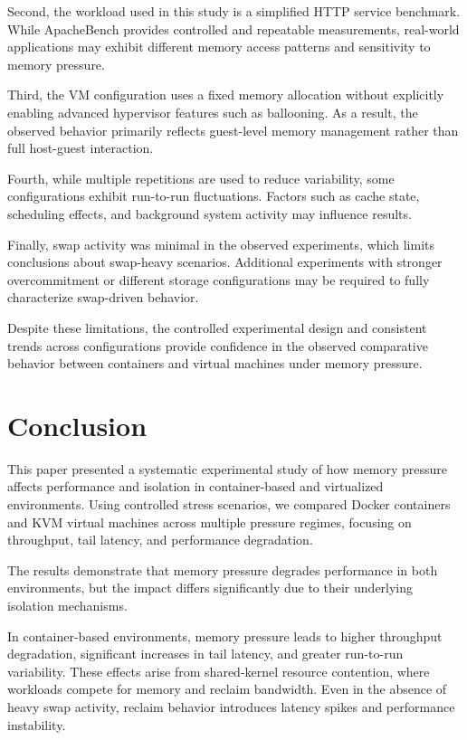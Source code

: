 \documentclass[conference]{IEEEtran}
\begin{document}
Second, the workload used in this study is a simplified HTTP service benchmark. While ApacheBench provides controlled and repeatable measurements, real-world applications may exhibit different memory access patterns and sensitivity to memory pressure.

Third, the VM configuration uses a fixed memory allocation without explicitly enabling advanced hypervisor features such as ballooning. As a result, the observed behavior primarily reflects guest-level memory management rather than full host-guest interaction.

Fourth, while multiple repetitions are used to reduce variability, some configurations exhibit run-to-run fluctuations. Factors such as cache state, scheduling effects, and background system activity may influence results.

Finally, swap activity was minimal in the observed experiments, which limits conclusions about swap-heavy scenarios. Additional experiments with stronger overcommitment or different storage configurations may be required to fully characterize swap-driven behavior.

Despite these limitations, the controlled experimental design and consistent trends across configurations provide confidence in the observed comparative behavior between containers and virtual machines under memory pressure.

\section{Conclusion}

This paper presented a systematic experimental study of how memory pressure affects performance and isolation in container-based and virtualized environments. Using controlled stress scenarios, we compared Docker containers and KVM virtual machines across multiple pressure regimes, focusing on throughput, tail latency, and performance degradation.

The results demonstrate that memory pressure degrades performance in both environments, but the impact differs significantly due to their underlying isolation mechanisms.

In container-based environments, memory pressure leads to higher throughput degradation, significant increases in tail latency, and greater run-to-run variability. These effects arise from shared-kernel resource contention, where workloads compete for memory and reclaim bandwidth. Even in the absence of heavy swap activity, reclaim behavior introduces latency spikes and performance instability.
\end{document}
